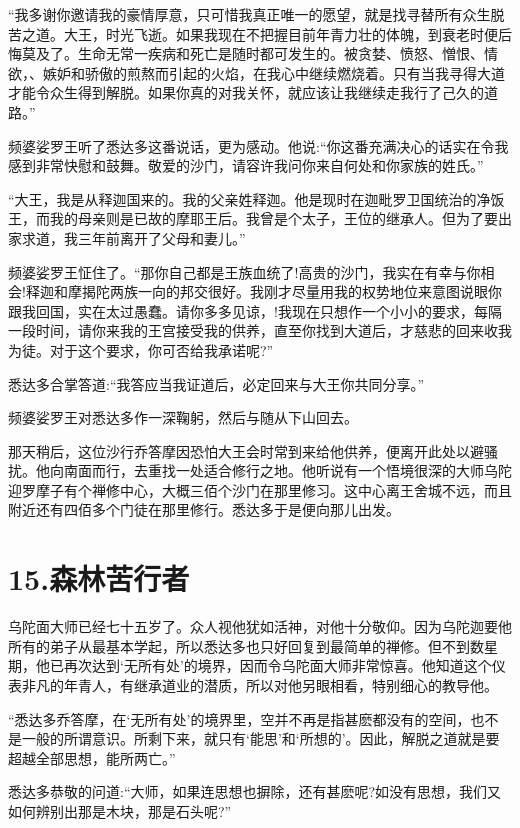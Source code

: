 \documentclass[12pt,twoside,openany]{book}
\begin{document}
“我多谢你邀请我的豪情厚意，只可惜我真正唯一的愿望，就是找寻替所有众生脱苦之道。大王，时光飞逝。如果我现在不把握目前年青力壮的体魄，到衰老时便后悔莫及了。生命无常一疾病和死亡是随时都可发生的。被贪婪、愤怒、憎恨、情欲，、嫉妒和骄傲的煎熬而引起的火焰，在我心中继续燃烧着。只有当我寻得大道才能令众生得到解脱。如果你真的对我关怀，就应该让我继续走我行了己久的道路。”

频婆娑罗王听了悉达多这番说话，更为感动。他说:“你这番充满决心的话实在令我感到非常快慰和鼓舞。敬爱的沙门，请容许我问你来自何处和你家族的姓氏。”

“大王，我是从释迦国来的。我的父亲姓释迦。他是现时在迦毗罗卫国统治的净饭王，而我的母亲则是已故的摩耶王后。我曾是个太子，王位的继承人。但为了要出家求道，我三年前离开了父母和妻儿。”

频婆娑罗王怔住了。“那你自己都是王族血统了!高贵的沙门，我实在有幸与你相会!释迦和摩揭陀两族一向的邦交很好。我刚才尽量用我的权势地位来意图说眼你跟我回国，实在太过愚蠢。请你多多见谅，!我现在只想作一个小小的要求，每隔一段时间，请你来我的王宫接受我的供养，直至你找到大道后，才慈悲的回来收我为徒。对于这个要求，你可否给我承诺呢?”

悉达多合掌答道:“我答应当我证道后，必定回来与大王你共同分享。”

频婆娑罗王对悉达多作一深鞠躬，然后与随从下山回去。

那天稍后，这位沙行乔答摩因恐怕大王会时常到来给他供养，便离开此处以避骚扰。他向南面而行，去重找一处适合修行之地。他听说有一个悟境很深的大师乌陀迎罗摩子有个禅修中心，大概三佰个沙门在那里修习。这中心离王舍城不远，而且附近还有四佰多个门徒在那里修行。悉达多于是便向那儿出发。


\chapter{15.森林苦行者}\label{ch15}

乌陀面大师已经七十五岁了。众人视他犹如活神，对他十分敬仰。因为乌陀迦要他所有的弟子从最基本学起，所以悉达多也只好回复到最简单的禅修。但不到数星期，他已再次达到‘无所有处’的境界，因而令乌陀面大师非常惊喜。他知道这个仪表非凡的年青人，有继承道业的潜质，所以对他另眼相看，特别细心的教导他。

“悉达多乔答摩，在‘无所有处’的境界里，空并不再是指甚麽都没有的空间，也不是一般的所谓意识。所剩下来，就只有‘能思’和‘所想的’。因此，解脱之道就是要超越全部思想，能所两亡。”

悉达多恭敬的问道:“大师，如果连思想也摒除，还有甚麽呢?如没有思想，我们又如何辨别出那是木块，那是石头呢?”
\end{document}
